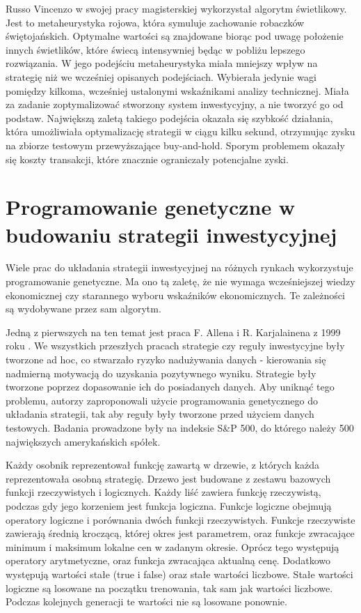 \documentclass[twoside]{iisthesis}
\begin{document}
Russo Vincenzo w swojej pracy magisterskiej \cite{Russo:2015} wykorzystał algorytm świetlikowy. Jest to metaheurystyka rojowa, która symuluje zachowanie robaczków świętojańskich. Optymalne wartości są znajdowane biorąc pod uwagę położenie innych świetlików, które świecą intensywniej będąc w pobliżu lepszego rozwiązania. W jego podejściu metaheurystyka miała mniejszy wpływ na strategię niż we wcześniej opisanych podejściach. Wybierała jedynie wagi pomiędzy kilkoma, wcześniej ustalonymi wskaźnikami analizy technicznej. Miała za zadanie zoptymalizować stworzony system inwestycyjny, a nie tworzyć go od podstaw. Największą zaletą takiego podejścia okazała się szybkość działania, która umożliwiała optymalizację strategii w ciągu kilku sekund, otrzymując zysku na zbiorze testowym przewyższające buy-and-hold. Sporym problemem okazały się koszty transakcji, które znacznie ograniczały potencjalne zyski.





\section{Programowanie genetyczne w budowaniu strategii inwestycyjnej}

Wiele prac do układania strategii inwestycyjnej na różnych rynkach wykorzystuje programowanie genetyczne. Ma ono tą zaletę, że nie wymaga wcześniejszej wiedzy ekonomicznej czy starannego wyboru wskaźników ekonomicznych. Te zależności są wydobywane przez sam algorytm. 

Jedną z pierwszych na ten temat jest praca F. Allena i R. Karjalainena z 1999 roku \cite{Allen1999245}. We wszystkich przeszłych pracach strategie czy reguły inwestycyjne były tworzone ad hoc, co stwarzało ryzyko nadużywania danych - kierowania się nadmierną motywacją do uzyskania pozytywnego wyniku. Strategie były tworzone poprzez dopasowanie ich do posiadanych danych. Aby uniknąć tego problemu, autorzy zaproponowali użycie programowania genetycznego do układania strategii, tak aby reguły były tworzone przed użyciem danych testowych. Badania prowadzone były na indeksie S\&P 500, do którego należy 500 największych amerykańskich spółek. 

Każdy osobnik reprezentował funkcję zawartą w drzewie, z których każda reprezentowała osobną strategię. Drzewo jest budowane z zestawu bazowych funkcji rzeczywistych i logicznych. Każdy liść zawiera funkcję rzeczywistą, podczas gdy jego korzeniem jest funkcja logiczna. Funkcje logiczne obejmują operatory logiczne i porównania dwóch funkcji rzeczywistych. Funkcje rzeczywiste zawierają średnią kroczącą, której okres jest parametrem, oraz funkcje zwracające minimum i maksimum lokalne cen w zadanym okresie. Oprócz tego występują operatory arytmetyczne, oraz funkcja zwracająca aktualną cenę. Dodatkowo występują wartości stałe (true i false) oraz stałe wartości liczbowe. Stałe wartości logiczne są losowane na początku trenowania, tak sam jak wartości liczbowe. Podczas kolejnych generacji te wartości nie są losowane ponownie.
\end{document}
